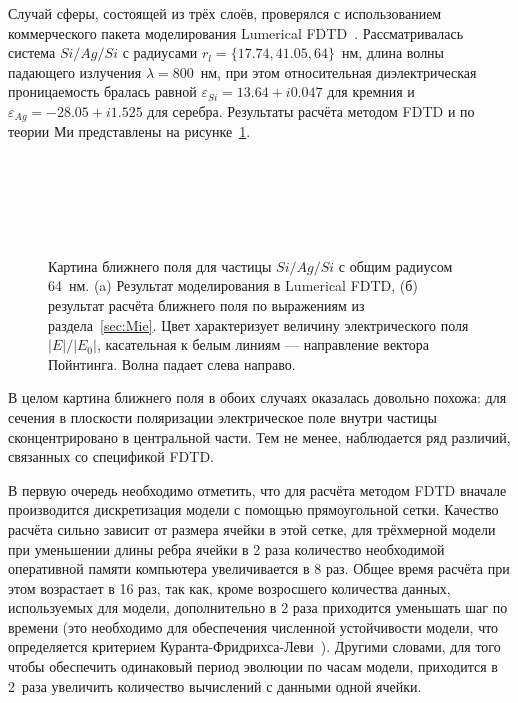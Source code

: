 Случай сферы, состоящей из трёх слоёв, проверялся с использованием
коммерческого пакета моделирования Lumerical
FDTD~\cite{Lumerical-web}. Рассматривалась система $Si/Ag/Si$ с
радиусами $r_l=\{17.74, 41.05, 64\}$~нм, длина волны падающего
излучения $\lambda = 800$~нм, при этом относительная диэлектрическая
проницаемость бралась равной $\varepsilon_{Si} = 13.64 + i 0.047$ для
кремния и $\varepsilon_{Ag} = -28.05 + i 1.525$ для серебра.
Результаты расчёта методом FDTD и по теории Ми представлены на
рисунке~\ref{img:fdtd}.
\begin{figure}[p] 
  \begin{minipage}[ht]{0.99\linewidth}
  \end{minipage}\\
  \vfill
  \begin{minipage}[ht]{0.99\linewidth}
  \end{minipage}\\
  \vfill
  \begin{minipage}[ht]{0.99\linewidth}
  \end{minipage}\\
  \vfill
  \begin{minipage}[ht]{0.99\linewidth}
  \end{minipage}
  \caption{Картина ближнего поля для частицы $Si/Ag/Si$ с общим
    радиусом 64~нм. (a) Результат моделирования в Lumerical FDTD, (б)
    результат расчёта ближнего поля по выражениям из
    раздела~\ref{sec:Mie}. Цвет характеризует величину электрического
    поля $|E|/|E_0|$, касательная к белым линиям --- направление
    вектора Пойнтинга. Волна падает слева направо.\label{img:fdtd}}
\end{figure}

В целом картина ближнего поля в обоих случаях оказалась довольно
похожа: для сечения в плоскости поляризации электрическое поле внутри
частицы сконцентрировано в центральной части. Тем не менее,
наблюдается ряд различий, связанных со спецификой FDTD.

В первую очередь необходимо отметить, что для расчёта методом FDTD
вначале производится дискретизация модели с помощью прямоугольной
сетки. Качество расчёта сильно зависит от размера ячейки в этой сетке,
для трёхмерной модели при уменьшении длины ребра ячейки в 2 раза
количество необходимой оперативной памяти компьютера увеличивается в 8
раз.  Общее время расчёта при этом возрастает в 16 раз, так как, кроме
возросшего количества данных, используемых для модели, дополнительно в
2 раза приходится уменьшать шаг по времени (это необходимо для
обеспечения численной устойчивости модели, что определяется критерием
Куранта-Фридрихса-Леви~\cite{Courant-1941}). Другими словами, для
того чтобы обеспечить одинаковый период эволюции по часам модели,
приходится в 2~раза увеличить количество вычислений с данными одной
ячейки.

